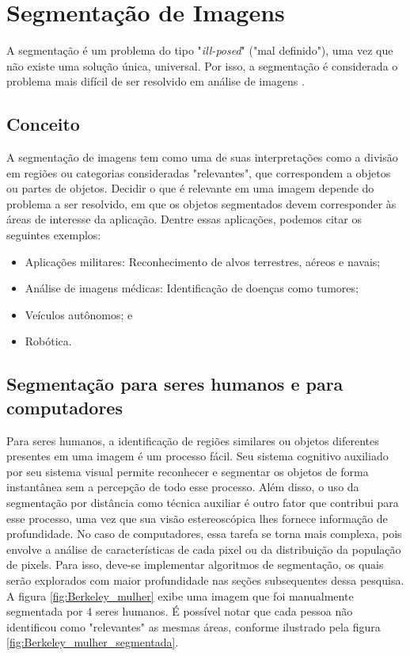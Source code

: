 \chapter{Segmentação de Imagens}\label{cap:segmentacao}
A segmentação é um problema do tipo "\textit{ill-posed}" ("mal definido"), uma vez que não existe uma solução única, universal. Por isso, a segmentação é considerada o problema mais difícil de ser resolvido em análise de imagens \citep{l6}.

\section{Conceito}
A segmentação de imagens tem como uma de suas interpretações como a divisão em regiões ou categorias consideradas "relevantes", que correspondem a objetos ou partes de objetos. Decidir o que é relevante em uma imagem depende do problema a ser resolvido, em que os objetos segmentados devem corresponder às áreas de interesse da aplicação. Dentre essas aplicações, podemos citar os seguintes exemplos:

\begin{itemize}
\item Aplicações militares: Reconhecimento de alvos terrestres, aéreos e navais;
\item Análise de imagens médicas: Identificação de doenças como tumores;
\item Veículos autônomos; e
\item Robótica.
\end{itemize}

\section{Segmentação para seres humanos e para computadores}\label{sec:segmenthm}
Para seres humanos, a identificação de regiões similares ou objetos diferentes presentes em uma imagem é um processo fácil. Seu sistema cognitivo auxiliado por seu sistema visual permite reconhecer e segmentar os objetos de forma instantânea sem a percepção de todo esse processo. Além disso, o uso da segmentação por distância como técnica auxiliar é outro fator que contribui para esse processo, uma vez que sua visão estereoscópica lhes fornece informação de profundidade.
No caso de computadores, essa tarefa se torna mais complexa, pois envolve a análise de características de cada pixel ou da distribuição da população de pixels. Para isso, deve-se implementar algoritmos de segmentação, os quais serão explorados com maior profundidade nas seções subsequentes dessa pesquisa. A figura \ref{fig:Berkeley_mulher} exibe uma imagem que foi manualmente segmentada por 4 seres humanos. É possível notar que cada pessoa não identificou como "relevantes" as mesmas áreas, conforme ilustrado pela figura \ref{fig:Berkeley_mulher_segmentada}. 

